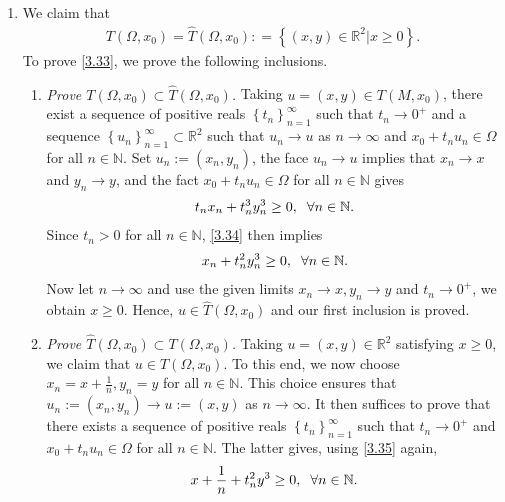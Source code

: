 \documentclass[a4paper]{article}
\numberwithin{equation}{section}
\begin{document}
\begin{enumerate}
\item We claim that
\begin{align}
\label{3.33}
T\left( {\Omega ,{x_0}} \right) = \widehat T\left( {\Omega ,{x_0}} \right): = \left\{ {\left( {x,y} \right) \in {\mathbb{R}^2}|x \ge 0} \right\}.
\end{align}
To prove \eqref{3.33}, we prove the following inclusions.
\begin{enumerate}
\item \textit{Prove $T\left( {\Omega ,{x_0}} \right) \subset \widehat T\left( {\Omega ,{x_0}} \right)$.} Taking $u=\left(x,y\right)\in T\left(M,x_0\right)$, there exist a sequence of positive reals $\left\{ {{t_n}} \right\}_{n = 1}^\infty $ such that $t_n\to 0^+$ and a sequence $\left\{ {{u_n}} \right\}_{n = 1}^\infty  \subset {\mathbb{R}^2}$ such that $u_n\to u$ as $n\to \infty$ and $x_0+t_nu_n\in \Omega$ for all $n\in \mathbb{N}$. Set $u_n:=\left(x_n,y_n\right)$, the face $u_n\to u$ implies that $x_n\to x$ and $y_n\to y$, and the fact $x_0+t_nu_n\in \Omega$ for all $n\in \mathbb{N}$ gives
\begin{align}
\label{3.34}
{t_n}{x_n} + t_n^3y_n^3 \ge 0,\hspace{0.2cm}\forall n \in \mathbb{N}.
\end{align}
Since $t_n>0$ for all $n\in \mathbb{N}$, \eqref{3.34} then implies
\begin{align}
\label{3.35}
{x_n} + t_n^2y_n^3 \ge 0,\hspace{0.2cm}\forall n \in \mathbb{N}.
\end{align}
Now let $n\to \infty$ and use the given limits $x_n\to x,y_n\to y$ and $t_n\to 0^+$, we obtain $x\ge 0$. Hence, $u\in \widehat{T}\left(\Omega,x_0\right)$ and our first inclusion is proved.
\item \textit{Prove $\widehat T\left( {\Omega ,{x_0}} \right) \subset T\left( {\Omega ,{x_0}} \right)$.} Taking $u=\left(x,y\right)\in \mathbb{R}^2$ satisfying $x\ge 0$, we claim that $u\in T\left(\Omega,x_0\right)$. To this end, we now choose $x_n=x+\frac{1}{n},y_n=y$ for all $n\in \mathbb{N}$. This choice ensures that $u_n:=\left(x_n,y_n\right)\to u:=\left(x,y\right)$ as $n\to \infty$. It then suffices to prove that there exists a sequence of positive reals $\left\{ {{t_n}} \right\}_{n = 1}^\infty $ such that $t_n\to 0^+$ and $x_0+t_nu_n\in \Omega$ for all $n\in \mathbb{N}$. The latter gives, using \eqref{3.35} again, 
\begin{align}
\label{3.36}
x + \frac{1}{n} + t_n^2{y^3} \ge 0,\hspace{0.2cm}\forall n \in \mathbb{N}.

\end{align}
\end{enumerate}
\end{enumerate}
\end{document}
